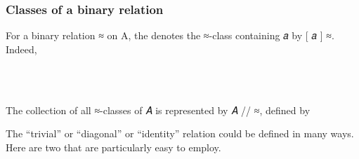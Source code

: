 \documentclass[a4paper,UKenglish,cleveref, autoref, thm-restate]{lipics-v2019}
\begin{document}
\subsubsection{Classes of a binary relation}
For a binary relation ≈ on A, the \agdaualib denotes the ≈-class containing 𝑎 by {[} 𝑎 {]} ≈. Indeed,
\begin{code}
\\[\AgdaEmptyExtraSkip]%
\>[0]\AgdaOperator{\AgdaFunction{[\AgdaUnderscore{}]\AgdaUnderscore{}}}\AgdaSpace{}%
\AgdaSymbol{:}%
\>[8]\AgdaSymbol{\{}\AgdaSpace{}%
\AgdaSymbol{:}\AgdaSpace{}%
\AgdaSpace{}%
\AgdaSpace{}%
\AgdaSymbol{\}}\AgdaSpace{}%
%
\>[22]\AgdaSymbol{(}\AgdaSpace{}%
\AgdaSymbol{:}\AgdaSpace{}%
\AgdaSymbol{)}\AgdaSpace{}%
\AgdaSpace{}%
\AgdaSpace{}%
\AgdaSpace{}%
\AgdaSpace{}%
\AgdaSpace{}%
\AgdaSpace{}%
\AgdaSpace{}%
\AgdaSpace{}%
\<%
\\
\>[0]\AgdaOperator{\AgdaFunction{[}}\AgdaSpace{}%
\AgdaSpace{}%
\AgdaOperator{\AgdaFunction{]}}\AgdaSpace{}%
\AgdaSpace{}%
\AgdaSymbol{=}\AgdaSpace{}%
\AgdaSpace{}%
\AgdaSpace{}%
\AgdaSpace{}%
\AgdaSymbol{\AgdaUnderscore{}}\AgdaSpace{}%
\AgdaFunction{,}%
\>[21]\AgdaSpace{}%
\AgdaSpace{}%
\<%
\end{code}
The collection of all ≈-classes of 𝐴 is represented by 𝐴 // ≈, defined by
\begin{code}\end{code}
The ``trivial'' or ``diagonal'' or ``identity'' relation could be defined in many ways.  Here are two that are particularly easy to employ.
\end{document}
